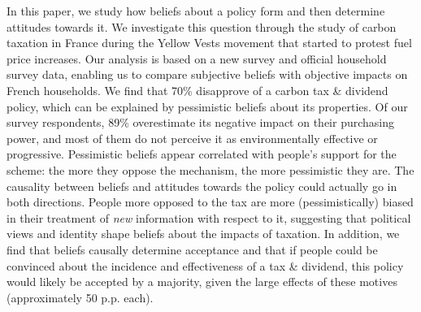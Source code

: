 \documentclass[12pt]{article} %
\begin{document}

In this paper, we study how beliefs about a policy form and then determine attitudes towards it. We investigate this question through the study of carbon taxation in France during the Yellow Vests movement that started to protest fuel price increases. Our analysis is based on a new survey and official household survey data, enabling us to compare subjective beliefs with objective impacts on French households. We find that 70\% disapprove of a carbon tax \& dividend policy, which can be explained by pessimistic beliefs about its properties. Of our survey respondents, 89\% overestimate its negative impact on their purchasing power, and most of them do not perceive it as environmentally effective or progressive. Pessimistic beliefs appear correlated with people's support for the scheme: the more they oppose the mechanism, the more pessimistic they are. The causality between beliefs and attitudes towards the policy could actually go in both directions. People more opposed to the tax are more (pessimistically) biased in their treatment of \textit{new} information with respect to it, suggesting that political views and identity shape beliefs about the impacts of taxation. In addition, we find that beliefs causally determine acceptance and that if people could be convinced about the incidence and effectiveness of a tax \& dividend, this policy would likely be accepted by a majority, given the large effects of these motives (approximately 50 p.p. each).%
\end{document}
